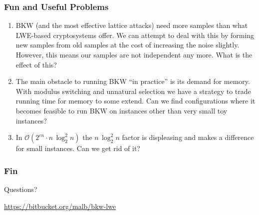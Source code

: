\documentclass[10pt]{beamer}
\def\polyfactor{n\, \log_2^2 n}
\newcommand{\bigO}[1]{\ensuremath{\mathcal{O}\left(#1\right)}\xspace}
\begin{document}
\begin{frame}
\frametitle{Fun and Useful Problems}
\begin{enumerate}
 \item BKW (and the most effective lattice attacks) need more samples than what LWE-based cryptosystems offer. We can attempt to deal with this by forming new samples from old samples at the cost of increasing the noise slightly. However, this means our samples are not independent any more. What is the effect of this?
 \item The main obstacle to running BKW ``in practice'' is its demand for memory. With modulus switching and unnatural selection we have a strategy to trade running time for memory to some extend. Can we find configurations where it becomes feasible to run BKW on instances other than very small toy instances?
 \item In $\bigO{2^{cn}\cdot \polyfactor}$ the $\polyfactor$ factor is displeasing and makes a difference for small instances. Can we get rid of it?
\end{enumerate}
\end{frame}


\begin{frame}
\frametitle{Fin}
\begin{center}
\large{Questions?}

\vspace{2em}

\url{https://bitbucket.org/malb/bkw-lwe}

\end{center}
\end{frame}
\end{document}
